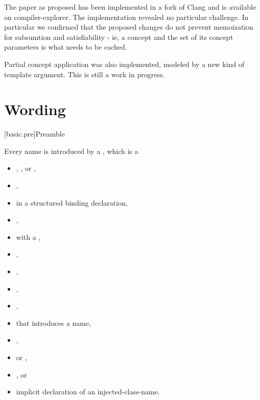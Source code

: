 \documentclass{wg21}
\begin{document}
The paper as proposed has been implemented in a fork of Clang and is available on compiler-explorer.
The implementation revealed no particular challenge. In particular we confirmed that the proposed changes
do not prevent memoization for subsumtion and satisfiability - ie, a concept and the set of its concept parameters
is what needs to be cached.

Partial concept application was also implemented, modeled by a new kind of template argument.
This is still a work in progress.

\section{Wording}

[basic.pre]{Preamble}

\pnum
Every name is introduced by a , which is a
\begin{itemize}
    \item
    ,
    , or
    ,
    \item
    ,
    \item
    in a structured binding declaration,
    \item
    ,
    \item
     with a ,
    \item
    ,
    \item
    ,
    \item
    ,
    \item
    ,\textbf{}
    \item
    that introduces a name,
    \item
    ,
    \item
     or
    ,
    \item
    , or
    \item
    implicit declaration of an injected-class-name.
\end{itemize}
\end{document}
